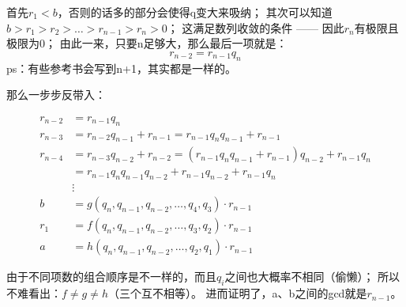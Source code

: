 \documentclass[12pt]{article}
\begin{document}
首先$r_{1}<b$，否则的话多的部分会使得q变大来吸纳；
其次可以知道$b>r_{1}>r_{2}>\dots>r_{n-1}>r_{n}>0$；
这满足数列收敛的条件 —— 因此$r_{n}$有极限且极限为0；
由此一来，只要n足够大，那么最后一项就是：
\begin{equation}
    r_{n-2} = r_{n-1}q_{n}
\end{equation}
ps：有些参考书会写到n+1，其实都是一样的。

那么一步步反带入：

\begin{align}
    r_{n-2} &= r_{n-1}q_{n}\\
    r_{n-3} &= r_{n-2}q_{n-1}+r_{n-1}=r_{n-1}q_{n}q_{n-1}+r_{n-1}\\
    r_{n-4} &= r_{n-3}q_{n-2}+r_{n-2}=(r_{n-1}q_{n}q_{n-1}+r_{n-1})q_{n-2}+r_{n-1}q_{n}\\ \nonumber
            &=r_{n-1}q_{n}q_{n-1}q_{n-2}+r_{n-1}q_{n-2}+r_{n-1}q_{n}\\
    &\vdots\nonumber\\
    b &= g(q_{n},q_{n-1},q_{n-2},\dots,q_{4},q_{3})\cdot r_{n-1}\\
    r_{1} &= f(q_{n},q_{n-1},q_{n-2},\dots,q_{3},q_{2})\cdot r_{n-1}\\
    a &= h(q_{n},q_{n-1},q_{n-2},\dots,q_{2},q_{1})\cdot r_{n-1}
\end{align}

由于不同项数的组合顺序是不一样的，而且$q_{i}$之间也大概率不相同（偷懒）；
所以不难看出：$f\neq g\neq h$（三个互不相等）。
进而证明了，a、b之间的gcd就是$r_{n-1}$。
\end{document}
